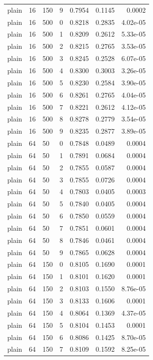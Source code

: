 \begin{footnotesize}
\begin{longtable}{lllrrrr}
plain & 16 & 150 & 9 & 0.7954 & 0.1145 & 0.0002 \\
plain & 16 & 500 & 0 & 0.8218 & 0.2835 & 4.02e-05 \\
plain & 16 & 500 & 1 & 0.8209 & 0.2612 & 5.33e-05 \\
plain & 16 & 500 & 2 & 0.8215 & 0.2765 & 3.53e-05 \\
plain & 16 & 500 & 3 & 0.8245 & 0.2528 & 6.07e-05 \\
plain & 16 & 500 & 4 & 0.8300 & 0.3003 & 3.26e-05 \\
plain & 16 & 500 & 5 & 0.8230 & 0.2584 & 3.90e-05 \\
plain & 16 & 500 & 6 & 0.8261 & 0.2765 & 4.04e-05 \\
plain & 16 & 500 & 7 & 0.8221 & 0.2612 & 4.12e-05 \\
plain & 16 & 500 & 8 & 0.8278 & 0.2779 & 3.54e-05 \\
plain & 16 & 500 & 9 & 0.8235 & 0.2877 & 3.89e-05 \\
plain & 64 & 50 & 0 & 0.7848 & 0.0489 & 0.0004 \\
plain & 64 & 50 & 1 & 0.7891 & 0.0684 & 0.0004 \\
plain & 64 & 50 & 2 & 0.7855 & 0.0587 & 0.0004 \\
plain & 64 & 50 & 3 & 0.7855 & 0.0726 & 0.0004 \\
plain & 64 & 50 & 4 & 0.7803 & 0.0405 & 0.0003 \\
plain & 64 & 50 & 5 & 0.7840 & 0.0405 & 0.0004 \\
plain & 64 & 50 & 6 & 0.7850 & 0.0559 & 0.0004 \\
plain & 64 & 50 & 7 & 0.7851 & 0.0601 & 0.0004 \\
plain & 64 & 50 & 8 & 0.7846 & 0.0461 & 0.0004 \\
plain & 64 & 50 & 9 & 0.7865 & 0.0628 & 0.0004 \\
plain & 64 & 150 & 0 & 0.8105 & 0.1690 & 0.0001 \\
plain & 64 & 150 & 1 & 0.8101 & 0.1620 & 0.0001 \\
plain & 64 & 150 & 2 & 0.8103 & 0.1550 & 8.76e-05 \\
plain & 64 & 150 & 3 & 0.8133 & 0.1606 & 0.0001 \\
plain & 64 & 150 & 4 & 0.8064 & 0.1369 & 4.37e-05 \\
plain & 64 & 150 & 5 & 0.8104 & 0.1453 & 0.0001 \\
plain & 64 & 150 & 6 & 0.8086 & 0.1425 & 8.70e-05 \\
plain & 64 & 150 & 7 & 0.8109 & 0.1592 & 8.25e-05 \\

\end{longtable}
\end{footnotesize}
